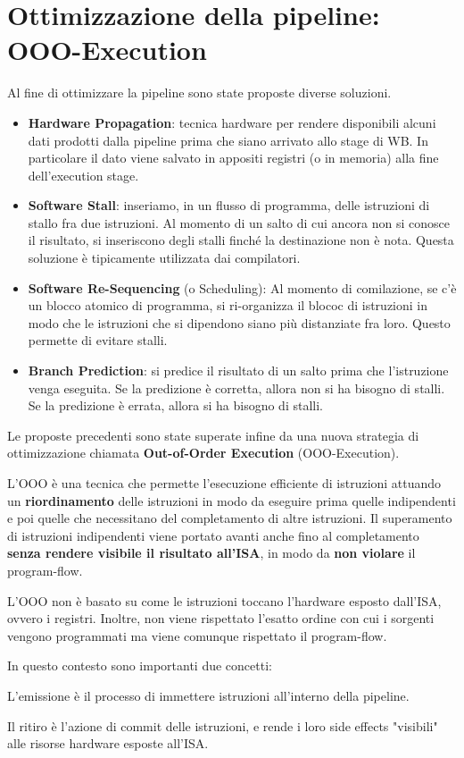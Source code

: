 \section{Ottimizzazione della pipeline: OOO-Execution}
Al fine di ottimizzare la pipeline sono state proposte diverse soluzioni.
\begin{itemize}
    \item \textbf{Hardware Propagation}: tecnica hardware per rendere disponibili alcuni dati prodotti dalla pipeline prima che siano arrivato allo stage di WB. In particolare il dato viene salvato in appositi registri (o in memoria) alla fine dell'execution stage.
    \item \textbf{Software Stall}: inseriamo, in un flusso di programma, delle istruzioni di stallo fra due istruzioni. Al momento di un salto di cui ancora non si conosce il risultato, si inseriscono degli stalli finché la destinazione non è nota.
    Questa soluzione è tipicamente utilizzata dai compilatori.
    \item \textbf{Software Re-Sequencing} (o Scheduling): Al momento di comilazione, se c'è un blocco atomico di programma, si ri-organizza il blococ di istruzioni in modo che le istruzioni che si dipendono siano più distanziate fra loro. Questo permette di evitare stalli.
    \item \textbf{Branch Prediction}: si predice il risultato di un salto prima che l'istruzione venga eseguita. Se la predizione è corretta, allora non si ha bisogno di stalli. Se la predizione è errata, allora si ha bisogno di stalli.
\end{itemize}
Le proposte precedenti sono state superate infine da una nuova strategia di ottimizzazione chiamata \textbf{Out-of-Order Execution} (OOO-Execution).

\begin{definition}\label{def:ooo-ex}
    L'OOO è una tecnica che permette l'esecuzione efficiente di istruzioni attuando un \textbf{riordinamento} delle istruzioni in modo da eseguire prima quelle indipendenti e poi quelle che necessitano del completamento di altre istruzioni.
    Il superamento di istruzioni indipendenti viene portato avanti anche fino al completamento \textbf{senza rendere visibile il risultato all'ISA}, in modo da \textbf{non violare} il program-flow.
\end{definition}
\begin{remark}
    L'OOO non è basato su come le istruzioni toccano l'hardware esposto dall'ISA, ovvero i registri. Inoltre, non viene rispettato l'esatto ordine con cui i sorgenti vengono programmati ma viene comunque rispettato il program-flow.
\end{remark}
In questo contesto sono importanti due concetti:
\begin{definition}[Emission]\label{def:emission}
    L'emissione è il processo di immettere istruzioni all'interno della pipeline.
\end{definition}
\begin{definition}[Retire]\label{def:retire}
    Il ritiro è l'azione di commit delle istruzioni, e rende i loro side effects "visibili" alle risorse hardware esposte all'ISA.
\end{definition}

